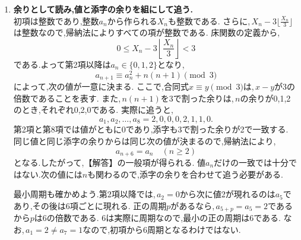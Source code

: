 \begin{enumerate}[label=(\arabic*),parsep=3pt,format=\bookitemlink{example-gauss-integer-draft}{solution}{problem}]
      \item \textbf{余りとして読み,値と添字の余りを組にして追う.}\\
            初項は整数であり,整数$a_n$から作られる$X_n$も整数である.
            さらに,\,$X_n-3\lfloor\frac{X_n}{3}\rfloor$は整数なので,帰納法によりすべての項が整数である.
            床関数の定義から,
            \[
              0\le X_n-3\left\lfloor\frac{X_n}{3}\right\rfloor<3
            \]
            である.よって第2項以降は$a_n\in\{0,1,2\}$となり,
            \[
              a_{n+1}\equiv a_n^2+n(n+1)\pmod3
            \]
            によって,次の値が一意に決まる.
            ここで,合同式$x\equiv y\pmod3$は,\,$x-y$が3の倍数であることを表す.
            また,\,$n(n+1)$を3で割った余りは,\,$n$の余りが0,1,2のとき,それぞれ0,2,0である.
            実際に追うと,
            \[
              a_1,a_2,\ldots,a_8=2,0,0,0,2,1,1,0.
            \]
            第2項と第8項では値がともに0であり,添字も3で割った余りが2で一致する.
            同じ値と同じ添字の余りからは同じ次の値が決まるので,帰納法により,
            \[
              a_{n+6}=a_n\quad(n\ge2)
            \]
            となる.したがって,【解答】の一般項が得られる.
            値$a_n$だけの一致では十分ではない.次の値には$n$も関わるので,添字の余りを合わせて追う必要がある.

            最小周期も確かめよう.第2項以降では,\,$a_2=0$から次に値2が現れるのは$a_5$であり,その後は6項ごとに現れる.
            正の周期$p$があるなら,\,$a_{5+p}=a_5=2$であるから$p$は6の倍数である.
            6は実際に周期なので,最小の正の周期は6である.
            なお,\,$a_1=2\ne a_7=1$なので,初項から6周期となるわけではない.


\end{enumerate}

